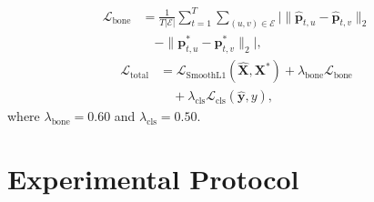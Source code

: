 \documentclass[10pt,twocolumn]{article}
\begin{document}
\begin{equation}
\begin{split}
    \mathcal{L}_{\text{bone}} &= \frac{1}{T|\mathcal{E}|}\sum_{t=1}^T \sum_{(u,v)\in\mathcal{E}} \Big| \|\hat{\mathbf{p}}_{t,u}-\hat{\mathbf{p}}_{t,v}\|_2 \\
    &\quad - \|\mathbf{p}^*_{t,u}-\mathbf{p}^*_{t,v}\|_2 \Big|,
\end{split}
\label{eq:lbone}
\end{equation}
\begin{equation}
\begin{split}
    \mathcal{L}_{\text{total}} &= \mathcal{L}_{\text{SmoothL1}}(\hat{\mathbf{X}}, \mathbf{X}^*) + \lambda_{\text{bone}} \mathcal{L}_{\text{bone}} \\
    &\quad + \lambda_{\text{cls}} \mathcal{L}_{\text{cls}}(\hat{\mathbf{y}}, y),
\end{split}
\label{eq:ltotal}
\end{equation}
where $\lambda_{\text{bone}}=0.60$ and $\lambda_{\text{cls}}=0.50$.

\section{Experimental Protocol}
\end{document}
